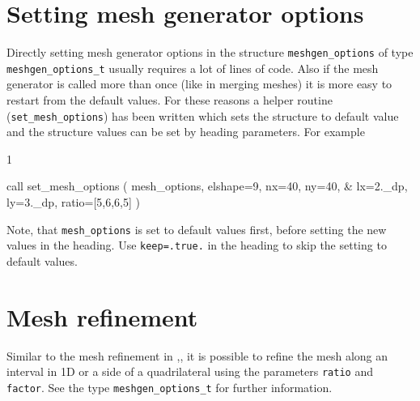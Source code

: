 \section{Setting mesh generator options}

Directly setting mesh generator options in the structure
\texttt{meshgen\_options} of type \texttt{meshgen\_options\_t} usually requires
a lot of lines of code. Also if the mesh generator is called more than once
(like in merging meshes) it is more easy to restart from the default values.
For these reasons a helper routine (\texttt{set\_mesh\_options}) has been
written which sets the structure to default value and the structure values can
be set by heading parameters. For example
\begin{listing}{1}
   
  call set_mesh_options ( mesh_options, elshape=9, nx=40, ny=40, &
    lx=2._dp, ly=3._dp, ratio=[5,6,6,5] )

\end{listing}
Note, that \texttt{mesh\_options} is set to default values first, before setting
the new values in the heading. Use \texttt{keep=.true.} in the heading to skip
the setting to default values.

\section{Mesh refinement}

Similar to the mesh refinement in \sep, it is possible to refine the mesh along
an interval in 1D or a side of a quadrilateral using the parameters
\texttt{ratio} and \texttt{factor}. See the type \texttt{meshgen\_options\_t}
for further information. 

